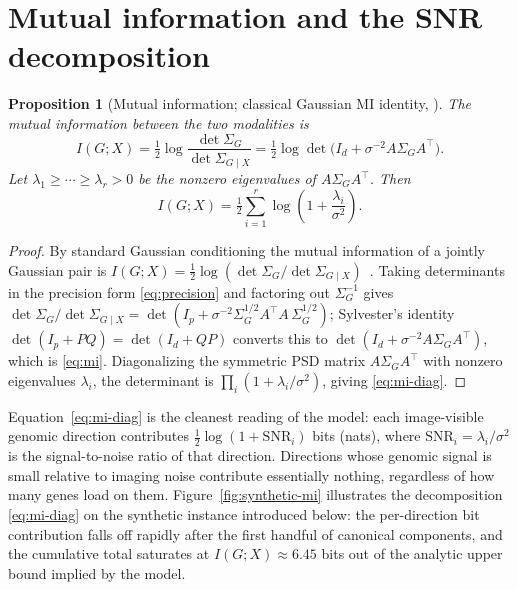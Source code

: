 \documentclass{article}
\newtheorem{proposition}{Proposition}
\newcommand{\Sg}{\Sigma_{G}}
\newcommand{\Sgcx}{\Sigma_{G\mid X}}
\newcommand{\T}{^{\top}}
\begin{document}
\section{Mutual information and the SNR decomposition}
\label{sec:mi}

\begin{proposition}[Mutual information; classical Gaussian MI identity, \citealp{cover2006elements}]
\label{prop:mi}
The mutual information between the two modalities is
\begin{equation}
I(G; X)
= \tfrac12 \log \frac{\det \Sg}{\det \Sgcx}
= \tfrac12 \log \det\!\big(I_d + \sigma^{-2} A \Sg A\T\big).
\label{eq:mi}
\end{equation}
Let $\lambda_1 \ge \cdots \ge \lambda_r > 0$ be the nonzero eigenvalues of
$A \Sg A\T$. Then
\begin{equation}
I(G; X) = \tfrac12 \sum_{i=1}^{r} \log\!\left(1 + \frac{\lambda_i}{\sigma^2}\right).
\label{eq:mi-diag}
\end{equation}
\end{proposition}

\begin{proof}
By standard Gaussian conditioning the mutual information of a jointly Gaussian
pair is $I(G;X)=\tfrac12\log(\det\Sg/\det\Sgcx)$~\citep{cover2006elements}.  %
Taking determinants in the precision form \eqref{eq:precision} and factoring out
$\Sg^{-1}$ gives
$\det\Sg/\det\Sgcx=\det(I_p+\sigma^{-2}\Sg^{1/2}A\T A\,\Sg^{1/2})$;  %
Sylvester's identity $\det(I_p+PQ)=\det(I_d+QP)$ converts this to
$\det(I_d+\sigma^{-2}A\Sg A\T)$, which is \eqref{eq:mi}.  %
Diagonalizing the symmetric PSD matrix $A\Sg A\T$ with nonzero eigenvalues
$\lambda_i$, the determinant is $\prod_i(1+\lambda_i/\sigma^2)$, giving
\eqref{eq:mi-diag}.  %
\end{proof}

Equation~\eqref{eq:mi-diag} is the cleanest reading of the model: each
image-visible genomic direction contributes
$\tfrac12 \log(1 + \mathrm{SNR}_i)$ bits (nats), where
$\mathrm{SNR}_i = \lambda_i / \sigma^2$ is the signal-to-noise ratio of that
direction. Directions whose genomic signal is small relative to imaging noise
contribute essentially nothing, regardless of how many genes load on them.
Figure~\ref{fig:synthetic-mi} illustrates the decomposition
\eqref{eq:mi-diag} on the synthetic instance introduced below: the per-direction
bit contribution falls off rapidly after the first handful of canonical
components, and the cumulative total saturates at $I(G;X)\approx 6.45$ bits
out of the analytic upper bound implied by the model.
\end{document}
